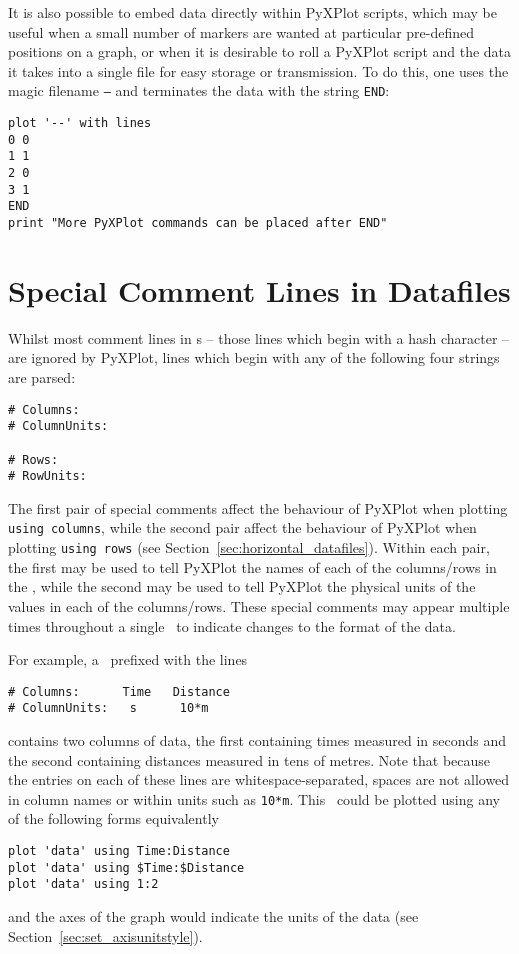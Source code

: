 It is also possible to embed data directly within PyXPlot scripts, which may be
useful when a small number of markers are wanted at particular pre-defined
positions on a graph, or when it is desirable to roll a PyXPlot script and the
data it takes into a single file for easy storage or transmission. To do this,
one uses the magic filename {\tt --} and terminates the data with the string
{\tt END}:

\begin{verbatim}
plot '--' with lines
0 0
1 1
2 0
3 1
END
print "More PyXPlot commands can be placed after END"
\end{verbatim}

\section{Special Comment Lines in Datafiles}
\label{sec:special_comments}

Whilst most comment lines in \datafile s -- those lines which begin with a hash
character -- are ignored by PyXPlot, lines which begin with any of the
following four strings are parsed:
\begin{verbatim}
# Columns:
# ColumnUnits:

# Rows:
# RowUnits:
\end{verbatim}
The first pair of special comments affect the behaviour of PyXPlot when
plotting {\tt using columns}, while the second pair affect the behaviour of
PyXPlot when plotting {\tt using rows} (see
Section~\ref{sec:horizontal_datafiles}). Within each pair, the first may be
used to tell PyXPlot the names of each of the columns/rows in the \datafile,
while the second may be used to tell PyXPlot the physical units of the values
in each of the columns/rows. These special comments may appear multiple times
throughout a single \datafile\ to indicate changes to the format of the data.

For example, a \datafile\ prefixed with the lines
\begin{verbatim}
# Columns:      Time   Distance
# ColumnUnits:   s      10*m
\end{verbatim}
contains two columns of data, the first containing times measured in seconds
and the second containing distances measured in tens of metres. Note that
because the entries on each of these lines are whitespace-separated, spaces are
not allowed in column names or within units such as {\tt 10*m}. This \datafile\
could be plotted using any of the following forms equivalently
\begin{verbatim}
plot 'data' using Time:Distance
plot 'data' using $Time:$Distance
plot 'data' using 1:2
\end{verbatim}
and the axes of the graph would indicate the units of the data (see
Section~\ref{sec:set_axisunitstyle}).

